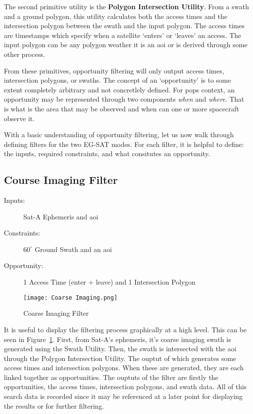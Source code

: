 The second primitive utility is the \textbf{Polygon Intersection Utility}.
From a swath and a ground polygon, this utility calculates both the access
times and the intersection polygon between the swath and the input polygon. The
access times are timestamps which specify when a satellite `enters' or `leaves'
an access. The input polygon can be any polygon weather it is an \gls{aoi} or
is derived through some other process.

From these primitives, opportunity filtering will only output access times,
intersection polygons, or swaths. The concept of an `opportunity' is to some
extent completely arbitrary and not concretlely defined. For \gls{pops}
context, an opportunity may be represented through two components \textit{when}
and \textit{where}. That is what is the area that may be observed and when can
one or more spacecraft observe it. 

With a basic understanding of opportunity filtering, let us now walk through
defining filters for the two EG-SAT modes. For each filter, it is helpful to
define: the inputs, required constraints, and what consitutes an opportunity.

\subsection{Course Imaging Filter}

\begin{description} 

    \item[Inputs:]  Sat-A Ephemeris and \gls{aoi}

    \item[Constraints:] $60^\circ$ Ground Swath and an \gls{aoi}

    \item[Opportunity:] 1 Access Time (enter + leave) and 1 Intersection Polygon

\end{description} 

\begin{figure}[h]
    \centering
    \texttt{[image: Coarse Imaging.png]} 
    \caption{Coarse Imaging Filter}
    \label{fig:filter-1} 
\end{figure}

It is useful to display the filtering process graphically at a high level.
This can be seen in Figure~\ref{fig:filter-1}. First, from Sat-A's ephemeris,
it's coarse imaging swath is generated using the Swath Utility. Then, the swath
is intersected with the \gls{aoi} through the Polygon Intersection Utility. The
ouptut of which generates some access times and intersection polygons. When
these are generated, they are each linked together as opportunities. The
ouptuts of the filter are firstly the opportunities, the access times,
intersection polygons, and swath data. All of this search data is recorded
since it may be referenced at a later point for displaying the results or for
further filtering.

